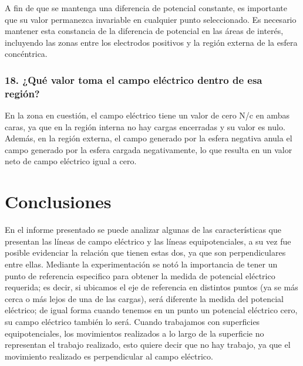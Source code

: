 \documentclass[letterpaper, 12pt]{report}
\begin{document}
A fin de que se mantenga una diferencia de potencial constante, es 
importante que su valor permanezca invariable en cualquier punto 
seleccionado. Es necesario mantener esta constancia de la diferencia 
de potencial en las áreas de interés, incluyendo las zonas entre los 
electrodos positivos y la región externa de la esfera concéntrica.

\subsubsection{18. ¿Qué valor toma el campo eléctrico dentro de esa región?}

En la zona en cuestión, el campo eléctrico tiene un valor de cero N/c en 
ambas caras, ya que en la región interna no hay cargas encerradas y su valor 
es nulo. Además, en la región externa, el campo generado por la esfera negativa 
anula el campo generado por la esfera cargada negativamente, lo que resulta 
en un valor neto de campo eléctrico igual a cero.

\section{Conclusiones}

En el informe presentado se puede analizar algunas de las 
características que presentan las líneas de campo eléctrico 
y las líneas equipotenciales, a su vez fue posible evidenciar 
la relación que tienen estas dos, ya que son perpendiculares 
entre ellas. Mediante la experimentación se notó la importancia
 de tener un punto de referencia especifico para obtener la 
 medida de potencial eléctrico requerida; es decir, si 
 ubicamos el eje de referencia en distintos puntos 
 (ya se más cerca o más lejos de una de las cargas), 
 será diferente la medida del potencial eléctrico; 
 de igual forma cuando tenemos en un punto un potencial 
 eléctrico cero, su campo eléctrico también lo será.
Cuando trabajamos con superficies equipotenciales, los 
movimientos realizados a lo largo de la superficie no 
representan el trabajo realizado, esto quiere decir que 
no hay trabajo, ya que el movimiento realizado es 
perpendicular al campo eléctrico.

\newpage


\end{document}
